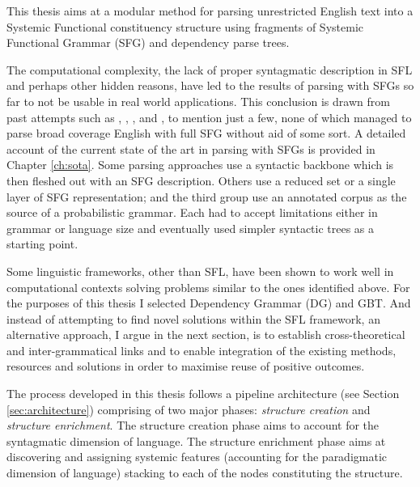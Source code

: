 This thesis aims at a modular method for parsing unrestricted English text into a Systemic Functional constituency structure using fragments of Systemic Functional Grammar (SFG) and dependency parse trees.

The computational complexity, the lack of proper syntagmatic description in SFL and perhaps other hidden reasons, have led to the results of parsing with SFGs so far to not be usable in real world applications. This conclusion is drawn from past attempts such as \citet{Kasper1988}, \citet{Kay1985}, \citet{ODonoghue1991a}, \citet{ODonnell1993} and \citet{Day2007}, to mention just a few, none of which managed to parse broad coverage English with full SFG without aid of some sort. A detailed account of the current state of the art in parsing with SFGs is provided in Chapter \ref{ch:sota}. Some parsing approaches use a syntactic backbone which is then fleshed out with an SFG description. Others use a reduced set or a single layer of SFG representation; and the third group use an annotated corpus as the source of a probabilistic grammar. Each had to accept limitations either in grammar or language size and eventually used simpler syntactic trees as a starting point.%


Some linguistic frameworks, other than SFL, have been shown to work well in computational contexts solving problems similar to the ones identified above. For the purposes of this thesis I selected Dependency Grammar (DG) and GBT. And instead of attempting to find novel solutions within the SFL framework, an alternative approach, I argue in the next section, is to establish cross-theoretical and inter-grammatical links and to enable integration of the existing methods, resources and solutions in order to maximise reuse of positive outcomes.

The process developed in this thesis follows a pipeline architecture (see Section \ref{sec:architecture}) comprising of two major phases: \textit{structure creation} and \textit{structure enrichment}. The structure creation phase aims to account for the syntagmatic dimension of language. %
The structure enrichment phase aims at discovering and assigning systemic features (accounting for the paradigmatic dimension of language) stacking to each of the nodes constituting the structure. 


